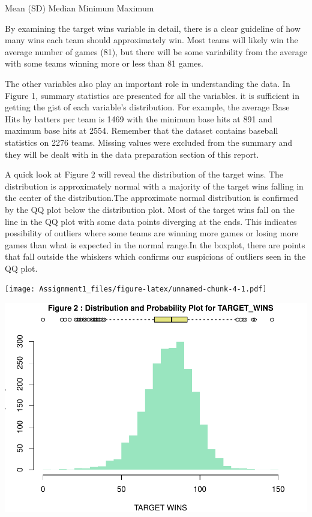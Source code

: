 \documentclass[
]{article}
\begin{document}
\begin{center}
Mean (SD) Median Minimum Maximum 
\end{center}

By examining the target wins variable in detail, there is a clear
guideline of how many wins each team should approximately win. Most
teams will likely win the average number of games (81), but there will
be some variability from the average with some teams winning more or
less than 81 games.

The other variables also play an important role in understanding the
data. In Figure 1, summary statistics are presented for all the
variables. it is sufficient in getting the gist of each variable's
distribution. For example, the average Base Hits by batters per team is
1469 with the minimum base hits at 891 and maximum base hits at 2554.
Remember that the dataset contains baseball statistics on 2276 teams.
Missing values were excluded from the summary and they will be dealt
with in the data preparation section of this report.

A quick look at Figure 2 will reveal the distribution of the target
wins. The distribution is approximately normal with a majority of the
target wins falling in the center of the distribution.The approximate
normal distribution is confirmed by the QQ plot below the distribution
plot. Most of the target wins fall on the line in the QQ plot with some
data points diverging at the ends. This indicates possibility of
outliers where some teams are winning more games or losing more games
than what is expected in the normal range.In the boxplot, there are
points that fall outside the whiskers which confirms our suspicions of
outliers seen in the QQ plot.

\texttt{[image: Assignment1\_files/figure-latex/unnamed-chunk-4-1.pdf]}

\includegraphics{Assignment1_files/figure-latex/unnamed-chunk-5-1.pdf}
\end{document}
